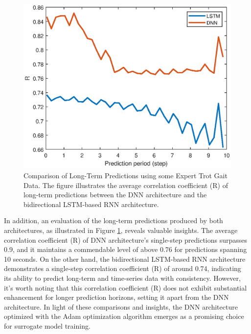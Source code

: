 \begin{figure}[htb]
    \centering
    \includegraphics[width=0.9\linewidth]{img/chap4/long2net.eps}
    \caption{Comparison of Long-Term Predictions using some Expert Trot Gait Data. The figure illustrates the average correlation coefficient (R) of long-term predictions between the DNN architecture and the bidirectional LSTM-based RNN architecture.}
    \label{fig:comp2net}
\end{figure}

In addition, an evaluation of the long-term predictions produced by both architectures, as illustrated in Figure \ref{fig:comp2net}, reveals valuable insights. The average correlation coefficient (R) of DNN architecture's single-step predictions surpasses 0.9, and it maintains a commendable level of above 0.76 for predictions spanning 10 seconds. On the other hand, the bidirectional LSTM-based RNN architecture demonstrates a single-step correlation coefficient (R) of around 0.74, indicating its ability to predict long-term and time-series data with consistency. However, it's worth noting that this correlation coefficient (R) does not exhibit substantial enhancement for longer prediction horizons, setting it apart from the DNN architecture. In light of these comparisons and insights, the DNN architecture optimized with the Adam optimization algorithm emerges as a promising choice for surrogate model training.


